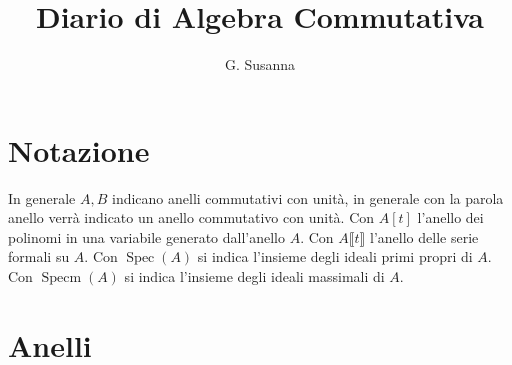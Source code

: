 \documentclass[italian]{article}
\title{Diario di Algebra Commutativa}
\author{G. Susanna}
\date{}
\begin{document}
    \maketitle
    \tableofcontents
    
    \section{Notazione}
    
    In generale $A,B$ indicano anelli commutativi con unità, in generale 
    con la parola anello verrà indicato un anello commutativo con unità.
    Con $A\left[t\right]$ l'anello dei polinomi in una variabile generato 
    dall'anello $A$. Con $A\llbracket t \rrbracket$ l'anello delle serie formali su $A$.
    Con $\operatorname{Spec}(A)$ si indica l'insieme degli ideali primi propri di $A$.
    Con $\operatorname{Specm}(A)$ si indica l'insieme degli ideali massimali di
    $A$.

    \section{Anelli}
\end{document}

